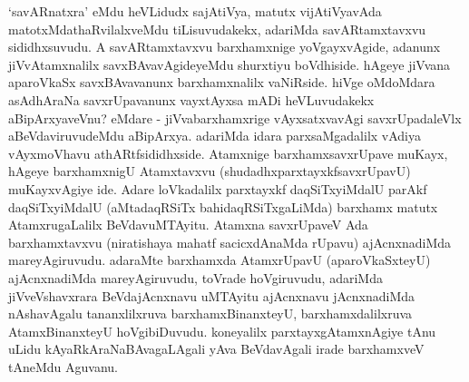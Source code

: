 \begin{artha}
`savARnatxra' eMdu heVLidudx sajAtiVya, matutx vijAtiVyavAda matotxMdathaRvilalxveMdu tiLisuvudakekx, adariMda savARtamxtavxvu sididhxsuvudu. A savARtamxtavxvu barxhamxnige yoVgayxvAgide, adanunx jiVvAtamxnalilx savxBAvavAgideyeMdu shurxtiyu boVdhiside. hAgeye jiVvana aparoVkaSx savxBAvavanunx barxhamxnalilx vaNiRside. hiVge oMdoMdara asAdhAraNa savxrUpavanunx vayxtAyxsa mADi heVLuvudakekx aBipArxyaveVnu? eMdare - jiVvabarxhamxrige vAyxsatxvavAgi savxrUpadaleVlx aBeVdaviruvudeMdu aBipArxya. adariMda idara parxsaMgadalilx vAdiya vAyxmoVhavu athARtfsididhxside. Atamxnige barxhamxsavxrUpave muKayx, hAgeye barxhamxnigU Atamxtavxvu (shudadhxparxtayxkfsavxrUpavU) muKayxvAgiye ide. Adare loVkadalilx parxtayxkf daqSiTxyiMdalU parAkf daqSiTxyiMdalU (aMtadaqRSiTx bahidaqRSiTxgaLiMda) barxhamx matutx AtamxrugaLalilx BeVdavuMTAyitu. Atamxna savxrUpaveV Ada barxhamxtavxvu (niratishaya mahatf sacicxdAnaMda rUpavu) ajAcnxnadiMda mareyAgiruvudu. adaraMte barxhamxda AtamxrUpavU (aparoVkaSxteyU) ajAcnxnadiMda mareyAgiruvudu, toVrade hoVgiruvudu, adariMda jiVveVshavxrara BeVdajAcnxnavu uMTAyitu ajAcnxnavu jAcnxnadiMda nAshavAgalu tananxlilxruva barxhamxBinanxteyU, barxhamxdalilxruva AtamxBinanxteyU hoVgibiDuvudu. koneyalilx parxtayxgAtamxnAgiye tAnu uLidu kAyaRkAraNaBAvagaLAgali yAva BeVdavAgali irade barxhamxveV tAneMdu Aguvanu. 
\end{artha}

